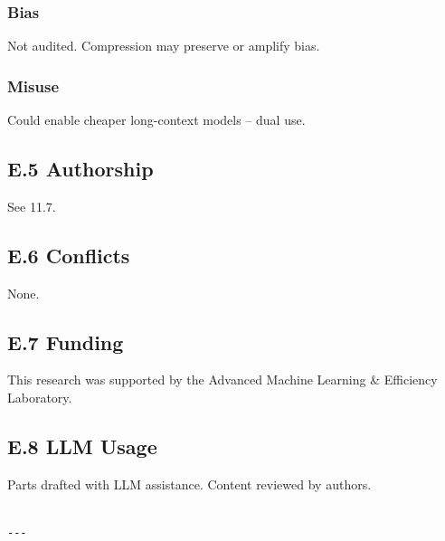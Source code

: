 \subsubsection{Bias}
Not audited. Compression may preserve or amplify bias.

\subsubsection{Misuse}
Could enable cheaper long-context models -- dual use.

\subsection{E.5 Authorship}

See  11.7.

\subsection{E.6 Conflicts}

None.

\subsection{E.7 Funding}

This research was supported by the Advanced Machine Learning & Efficiency Laboratory.

\subsection{E.8 LLM Usage}

Parts drafted with LLM assistance. Content reviewed by authors.
\begin{lstlisting}

---
\end{lstlisting}